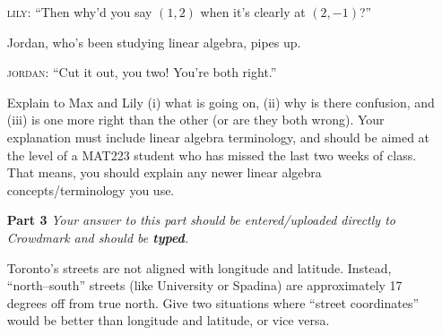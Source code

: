 \documentclass[letter]{article}
\begin{document}
\begin{enumerate}
	\textsc{lily:} ``Then why'd you say $(1, 2)$ when it's clearly at $(2, -1)$?''

	Jordan, who's been studying linear algebra, pipes up.

	\textsc{jordan:} ``Cut it out, you two! You're both right.''

	\bigskip
			Explain to Max and Lily (i) what is going on, (ii) why is there confusion, and (iii) is one more right
			than the other (or are they both wrong).
	Your explanation must include linear algebra terminology, and
		should be aimed at the level of a MAT223 student who has missed the last two weeks of class. 
		That means, you should explain any newer linear algebra concepts/terminology you use.

	
	\item[\bf Part 3] \emph{\color{blue}Your answer to this part should be entered/uploaded directly to Crowdmark and should be {\bfseries typed}.}

	Toronto's streets are not aligned with longitude and latitude.  Instead, ``north--south'' streets (like University or Spadina) are approximately 17 degrees off from true north.  Give two situations where ``street coordinates'' would be better than longitude and latitude, or vice versa.

	\end{enumerate}
\end{document}
